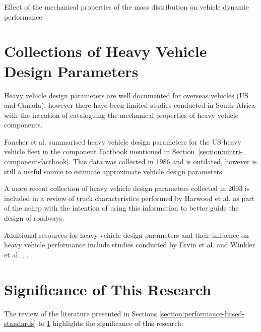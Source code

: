 \begin{table}[H]
\begin{threeparttable}
		\caption{Effect of the mechanical properties of the mass distribution on vehicle dynamic performance \cite{Fancher1986}}
		\label{table:effect-of-the-mechanical-properties-of-mass-distribution-on-vehicle-dynamic-performance}

	\end{threeparttable}
\end{table}

\section{Collections of Heavy Vehicle Design Parameters}\label{section:collections-of-heavy-vehicle-design-parameters}
Heavy vehicle design parameters are well documented for overseas vehicles (US and Canada), however there have been limited studies conducted in South Africa with the intention of cataloguing the mechanical properties of heavy vehicle components.

Fancher et al. \cite{Fancher1986} summarised heavy vehicle design parameters for the US heavy vehicle fleet in the component Factbook mentioned in Section~\ref{section:umtri-component-factbook}. This data was collected in 1986 and is outdated, however is still a useful source to estimate approximate vehicle design parameters.

A more recent collection of heavy vehicle design parameters collected in 2003 is included in a review of truck characteristics performed by Harwood et al. \cite{Harwood2003} as part of the \gls{nchrp} with the intention of using this information to better guide the design of roadways.

Additional resources for heavy vehicle design parameters and their influence on heavy vehicle performance include studies conducted by Ervin et al. \cite{Ervin1986} and Winkler et al. \cite{Winkler1995}, \cite{Winkler2011}.

\section{Significance of This Research}\label{section:significance-of-this-research}
The review of the literature presented in Sections \ref{section:performance-based-standards} to \ref{section:collections-of-heavy-vehicle-design-parameters} highlights the significance of this research:

